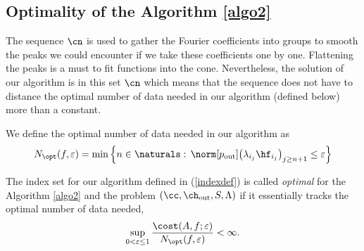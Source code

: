 \documentclass[final]{elsarticle}
\newcommand{\chout}{\ch_{\text{\rm{out}}}}
\newcommand{\pout}{p_{\text{\rm{out}}}}
\theoremstyle{definition}
\theoremstyle{remark}
\begin{document}
\subsection{Optimality of the Algorithm \ref{algo2}}

The sequence $\cn$ is used to gather the Fourier coefficients into groups to smooth the peaks we could encounter if we take these coefficients one by one. Flattening the peaks is a must to fit functions into the cone. Nevertheless, the solution of our algorithm is in this set $\cn$ which means that the sequence does not have to distance the optimal number of data needed in our algorithm (defined below) more than a constant.

We define the optimal number of data needed in our algorithm as
\begin{equation*}
N_{\opt}(f,\varepsilon)=\min\left\{n\in\naturals:\,\norm[\pout]{\left(\lambda_{i_j} \hf_{i_j} \right)_{j\ge n+1}} \le \varepsilon \right\}
\end{equation*}

The index set for our algorithm defined in (\ref{indexdef}) is called \emph{optimal} for the Algorithm \ref{algo2} and the problem $(\cc,\chout,S,\Lambda)$ if it essentially tracks the optimal number of data needed,
\begin{equation} \label{nearoptdef}
\sup_{0 < \varepsilon \le 1} \frac{\cost(A,f;\varepsilon)} {N_{\opt}(f,\varepsilon)} <\infty.
\end{equation}
\end{document}
